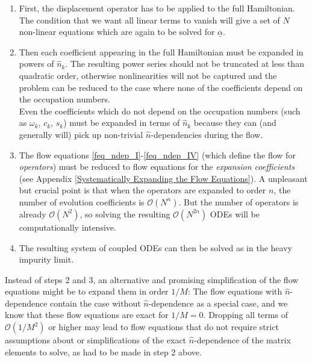 \begin{enumerate}
\item First, the displacement operator has to be applied to the full Hamiltonian. The condition that we want all linear terms to vanish will give a set of $N$ non-linear equations which are again to be solved for $\underline\alpha$. 
\item Then each coefficient appearing in the full Hamiltonian must be expanded in powers of $\hat n_k$. The resulting power series should not be truncated at less than quadratic order, otherwise nonlinearities will not be captured and the problem can be reduced to the case where none of the coefficients depend on the occupation numbers. \\ Even the coefficients which do not depend on the occupation numbers (such as $\omega_k$, $c_k$, $s_k$) must be expanded in terms of $\hat n_k$ because they can (and generally will) pick up non-trivial $\hat n$-dependencies during the flow.
\item The flow equations \ref{feq_ndep_I}-\ref{feq_ndep_IV} (which define the flow for \emph{operators}) must be reduced to flow equations for the \emph{expansion coefficients} (see Appendix \ref{Systematically Expanding the Flow Equations}). A unpleasant but crucial point is that when the operators are expanded to order $n$, the number of evolution coefficients is $\mathcal O(N^n)$. But the number of operators is already $\mathcal O(N^2)$, so solving the resulting $\mathcal O(N^{2n})$ ODEs will be computationally intensive.
\item The resulting system of coupled ODEs can then be solved as in the heavy impurity limit.
\end{enumerate}
Instead of steps 2 and 3, an alternative and promising simplification of the flow equations might be to expand them in order $1/M$: The flow equations with $\hat n$-dependence contain the case without $\hat n$-dependence as a special case, and we know that these flow equations are exact for $1/M=0$. Dropping all terms of $\mathcal O(1/M^2)$ or higher may lead to flow equations that do not require strict assumptions about or simplifications of the exact $\hat n$-dependence of the matrix elements to solve, as had to be made in step 2 above.





























































